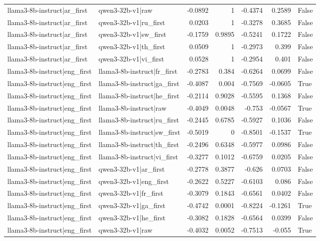 \begin{table}
\begin{tabular}{l l r r r r l}
llama3-8b-instruct|ar_first & qwen3-32b-v1|raw & -0.0892 & 1 & -0.4374 & 0.2589 & False \\
llama3-8b-instruct|ar_first & qwen3-32b-v1|ru_first & 0.0203 & 1 & -0.3278 & 0.3685 & False \\
llama3-8b-instruct|ar_first & qwen3-32b-v1|sw_first & -0.1759 & 0.9895 & -0.5241 & 0.1722 & False \\
llama3-8b-instruct|ar_first & qwen3-32b-v1|th_first & 0.0509 & 1 & -0.2973 & 0.399 & False \\
llama3-8b-instruct|ar_first & qwen3-32b-v1|vi_first & 0.0528 & 1 & -0.2954 & 0.401 & False \\
llama3-8b-instruct|eng_first & llama3-8b-instruct|fr_first & -0.2783 & 0.384 & -0.6264 & 0.0699 & False \\
llama3-8b-instruct|eng_first & llama3-8b-instruct|ga_first & -0.4087 & 0.004 & -0.7569 & -0.0605 & True \\
llama3-8b-instruct|eng_first & llama3-8b-instruct|he_first & -0.2114 & 0.9028 & -0.5595 & 0.1368 & False \\
llama3-8b-instruct|eng_first & llama3-8b-instruct|raw & -0.4049 & 0.0048 & -0.753 & -0.0567 & True \\
llama3-8b-instruct|eng_first & llama3-8b-instruct|ru_first & -0.2445 & 0.6785 & -0.5927 & 0.1036 & False \\
llama3-8b-instruct|eng_first & llama3-8b-instruct|sw_first & -0.5019 & 0 & -0.8501 & -0.1537 & True \\
llama3-8b-instruct|eng_first & llama3-8b-instruct|th_first & -0.2496 & 0.6348 & -0.5977 & 0.0986 & False \\
llama3-8b-instruct|eng_first & llama3-8b-instruct|vi_first & -0.3277 & 0.1012 & -0.6759 & 0.0205 & False \\
llama3-8b-instruct|eng_first & qwen3-32b-v1|ar_first & -0.2778 & 0.3877 & -0.626 & 0.0703 & False \\
llama3-8b-instruct|eng_first & qwen3-32b-v1|eng_first & -0.2622 & 0.5227 & -0.6103 & 0.086 & False \\
llama3-8b-instruct|eng_first & qwen3-32b-v1|fr_first & -0.3079 & 0.1843 & -0.6561 & 0.0402 & False \\
llama3-8b-instruct|eng_first & qwen3-32b-v1|ga_first & -0.4742 & 0.0001 & -0.8224 & -0.1261 & True \\
llama3-8b-instruct|eng_first & qwen3-32b-v1|he_first & -0.3082 & 0.1828 & -0.6564 & 0.0399 & False \\
llama3-8b-instruct|eng_first & qwen3-32b-v1|raw & -0.4032 & 0.0052 & -0.7513 & -0.055 & True \\

\end{tabular}
\end{table}
